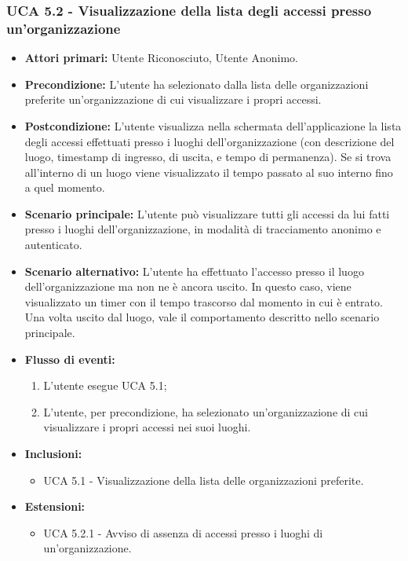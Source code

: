 \subsubsection{UCA 5.2 - Visualizzazione della lista degli accessi presso un'organizzazione}
\begin{itemize}
    \item \textbf{Attori primari:} Utente Riconosciuto, Utente Anonimo.
    \item \textbf{Precondizione:} L'utente ha selezionato dalla lista delle organizzazioni preferite un'organizzazione di cui visualizzare i propri accessi.
    \item \textbf{Postcondizione:} L’utente visualizza nella schermata dell’applicazione la lista degli accessi effettuati presso i luoghi dell’organizzazione (con descrizione del luogo, timestamp di ingresso, di uscita, e tempo di permanenza).
    Se si trova all'interno di un luogo viene visualizzato il tempo passato al suo interno fino a quel momento.
    \item \textbf{Scenario principale:} L'utente può visualizzare tutti gli accessi da lui fatti presso i luoghi dell'organizzazione, in modalità di tracciamento anonimo e autenticato.
    \item \textbf{Scenario alternativo:} L'utente ha effettuato l'accesso presso il luogo dell'organizzazione ma non ne è ancora uscito. In questo caso, viene visualizzato un timer con il tempo trascorso dal momento in cui è entrato.
    Una volta uscito dal luogo, vale il comportamento descritto nello scenario principale. 
    \item \textbf{Flusso di eventi:}
    \begin{enumerate}
        \item L'utente esegue UCA 5.1;
        \item L'utente, per precondizione, ha selezionato un'organizzazione di cui visualizzare i propri accessi nei suoi luoghi.
    \end{enumerate}
    \item \textbf{Inclusioni:} %
    \begin{itemize}
        \item UCA 5.1 - Visualizzazione della lista delle organizzazioni preferite.
    \end{itemize}
    \item \textbf{Estensioni:}
    \begin{itemize}
        \item UCA 5.2.1 - Avviso di assenza di accessi presso i luoghi di un’organizzazione.
    \end{itemize}
\end{itemize}

